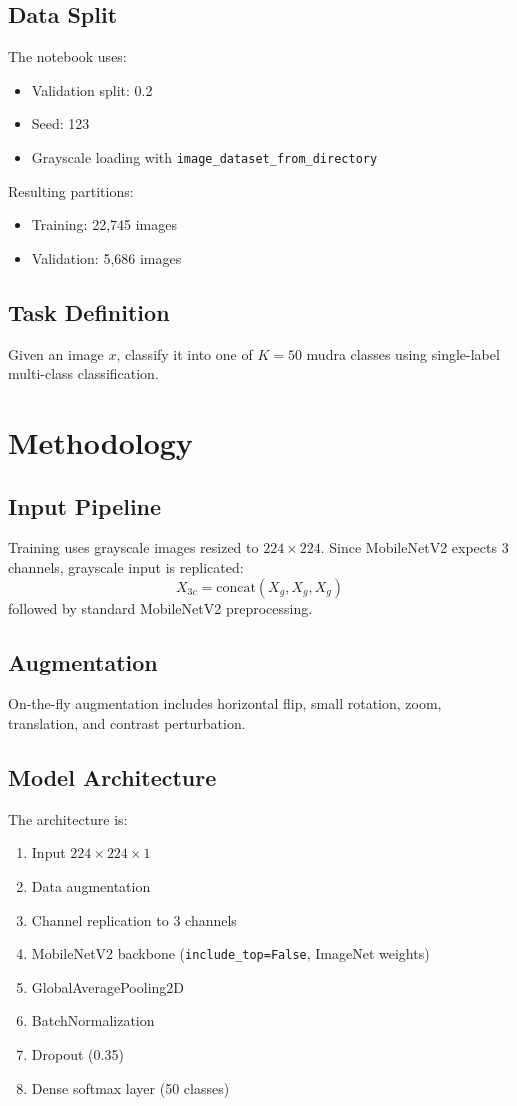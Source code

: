 \documentclass[conference]{IEEEtran}
\begin{document}
\subsection{Data Split}
The notebook uses:
\begin{itemize}
\item Validation split: 0.2
\item Seed: 123
\item Grayscale loading with \texttt{image\_dataset\_from\_directory}
\end{itemize}
Resulting partitions:
\begin{itemize}
\item Training: 22,745 images
\item Validation: 5,686 images
\end{itemize}

\subsection{Task Definition}
Given an image \(x\), classify it into one of \(K=50\) mudra classes using single-label multi-class classification.

\section{Methodology}
\subsection{Input Pipeline}
Training uses grayscale images resized to \(224 \times 224\). Since MobileNetV2 expects 3 channels, grayscale input is replicated:
\begin{equation}
X_{3c} = \mathrm{concat}(X_g, X_g, X_g)
\end{equation}
followed by standard MobileNetV2 preprocessing.

\subsection{Augmentation}
On-the-fly augmentation includes horizontal flip, small rotation, zoom, translation, and contrast perturbation.

\subsection{Model Architecture}
The architecture is:
\begin{enumerate}
\item Input \(224 \times 224 \times 1\)
\item Data augmentation
\item Channel replication to 3 channels
\item MobileNetV2 backbone (\texttt{include\_top=False}, ImageNet weights)
\item GlobalAveragePooling2D
\item BatchNormalization
\item Dropout (0.35)
\item Dense softmax layer (50 classes)
\end{enumerate}
\end{document}
